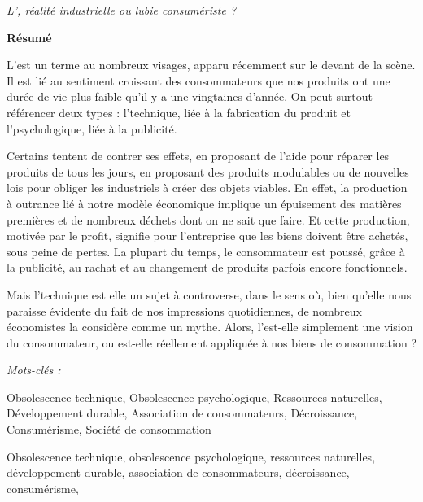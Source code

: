 \vspace{-1cm}\begin{center}
\textit{L'\OP, réalité industrielle ou lubie consumériste ? }
\end{center}


\begin{Large}
\textbf{Résumé}
\end{Large}

\vspace{1\baselineskip}

L'\op est un terme au nombreux visages, apparu récemment sur le devant de la scène. Il est lié au sentiment croissant des consommateurs que nos produits ont une durée de vie plus faible qu'il y a une vingtaines d'année. 
On peut surtout référencer deux types : l'\op technique, liée à la fabrication du produit et l'\op psychologique, liée à la publicité.

Certains tentent de contrer ses effets, en proposant de l'aide pour réparer les produits de tous les jours, en proposant des produits modulables ou de nouvelles lois pour obliger les industriels à créer des objets viables. 
En effet, la production à outrance lié à notre modèle économique implique un épuisement des matières premières et de nombreux déchets dont on ne sait que faire. Et cette production, motivée par le profit, signifie pour l'entreprise que les biens doivent être achetés, sous peine de pertes. La plupart du temps, le consommateur est poussé, grâce à la publicité, au rachat et au changement de produits parfois encore fonctionnels. 

Mais l'\op technique est elle un sujet à controverse, dans le sens où, bien qu'elle nous paraisse évidente du fait de nos impressions quotidiennes, de nombreux économistes la considère comme un mythe. Alors, l'\op est-elle simplement une vision du consommateur, ou est-elle réellement appliquée à nos biens de consommation ?

\vspace{2\baselineskip}

\begin{large} \emph{Mots-clés :} \end{large}Obsolescence technique, Obsolescence psychologique, Ressources naturelles, Développement durable, Association de consommateurs, Décroissance, Consumérisme, Société de consommation

Obsolescence technique, obsolescence psychologique, ressources naturelles, développement durable, association de consommateurs, décroissance, consumérisme, 


